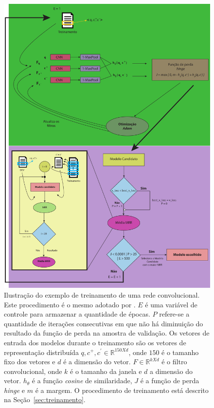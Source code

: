 \begin{figure}[p]
\centering
\includegraphics[height=1.3\textwidth]{figuras/cap-experimento/evaluation_process.pdf}
\caption{Ilustração do exemplo de treinamento de uma rede convolucional. Este procedimento é o mesmo adotado por \cite{iyer-etal-2016-summarizing}. $E$ é uma variável de controle para armazenar a quantidade de épocas. $P$ refere-se a quantidade de iterações consecutivas em que não há diminuição do resultado da função de perda na amostra de validação. Os vetores de entrada dos modelos durante o treinamento são os vetores de representação distribuída $q, c^{+}, c^{'} \in \mathbb{R}^{150 X d}$, onde $150$ é o tamanho fixo dos vetores e $d$ é a dimensão do vetor. $F \in \mathbb{R}^{k X d}$ é o filtro convolucional, onde $k$ é o tamanho da janela e $d$ a dimensão do vetor. $h_{\theta}$ é a função \textit{cosine} de similaridade, $J$ é a função de perda \textit{hinge} e $m$ é a margem. O procedimento de treinamento está descrito na Seção~\ref{sec:treinamento}.}
\label{fig:evaluation-process}
\end{figure}

